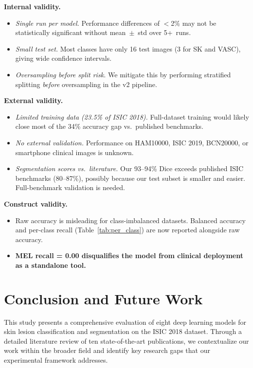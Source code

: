 \documentclass[10pt,twocolumn]{article}
\begin{document}
\textbf{Internal validity.}
\begin{itemize}
  \item \textit{Single run per model.} Performance differences of $<$2\% may
        not be statistically significant without mean~$\pm$~std over 5+~runs.
  \item \textit{Small test set.} Most classes have only 16 test images
        (3 for SK and VASC), giving wide confidence intervals.
  \item \textit{Oversampling before split risk.} We mitigate this by performing
        stratified splitting \textit{before} oversampling in the v2 pipeline.
\end{itemize}

\textbf{External validity.}
\begin{itemize}
  \item \textit{Limited training data (23.5\% of ISIC 2018).} Full-dataset
        training would likely close most of the 34\% accuracy gap vs.\
        published benchmarks.
  \item \textit{No external validation.} Performance on HAM10000, ISIC 2019,
        BCN20000, or smartphone clinical images is unknown.
  \item \textit{Segmentation scores vs.\ literature.} Our 93--94\% Dice
        exceeds published ISIC benchmarks (80--87\%), possibly because our
        test subset is smaller and easier. Full-benchmark validation is needed.
\end{itemize}

\textbf{Construct validity.}
\begin{itemize}
  \item Raw accuracy is misleading for class-imbalanced datasets. Balanced
        accuracy and per-class recall (Table~\ref{tab:per_class}) are now
        reported alongside raw accuracy.
  \item \textbf{MEL recall = 0.00 disqualifies the model from clinical
        deployment as a standalone tool.}
\end{itemize}


\section{Conclusion and Future Work}

This study presents a comprehensive evaluation of eight deep learning models for skin lesion classification and segmentation on the ISIC 2018 dataset. Through a detailed literature review of ten state-of-the-art publications, we contextualize our work within the broader field and identify key research gaps that our experimental framework addresses.
\end{document}
